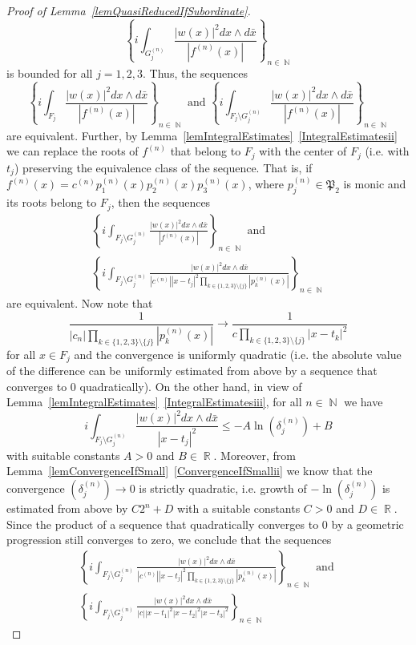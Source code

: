 \documentclass{amsart}
\numberwithin{equation}{section}
\theoremstyle{definition}
\theoremstyle{remark}
\DeclareMathOperator{\RR}{\mathbb R}
\DeclareMathOperator{\NN}{\mathbb N}
\begin{document}
\begin{proof}[Proof of Lemma~\ref{lemQuasiReducedIfSubordinate}]
		\[
		\left\{i\int_{G_j^{(n)}}\frac{|w(x)|^2dx \wedge d\bar{x}}{|f^{(n)}(x)|}\right\}_{n \in \NN}
		\]
		is bounded for all $j = 1,2,3$. Thus, the sequences
		\[
		\left\{i\int_{F_j}\frac{|w(x)|^2dx \wedge d\bar{x}}{|f^{(n)}(x)|}\right\}_{n \in \NN} \text{ and } \left\{i\int_{F_j \setminus G_j^{(n)}}\frac{|w(x)|^2dx \wedge d\bar{x}}{|f^{(n)}(x)|}\right\}_{n \in \NN}
		\]
		are equivalent. Further, by Lemma~\ref{lemIntegralEstimates}~\ref{IntegralEstimatesii} we can replace the roots of $f^{(n)}$ that belong to $F_j$ with the center of $F_j$ (i.e. with $t_j$) preserving the equivalence class of the sequence. That is, if $f^{(n)}(x) = c^{(n)}p_1^{(n)}(x)p_2^{(n)}(x)p_3^{(n)}(x)$, where $p_j^{(n)} \in \mathfrak P_2$ is monic and its roots belong to $F_j$, then the sequences
		\begin{multline*}
			\left\{i\int_{F_j \setminus G_j^{(n)}}\frac{|w(x)|^2dx \wedge d\bar{x}}{|f^{(n)}(x)|}\right\}_{n \in \NN} \text{ and }\\ \left\{i\int_{F_j \setminus G_j^{(n)}}\frac{|w(x)|^2dx \wedge d\bar{x}}{|c^{(n)}||x - t_j|^2\displaystyle\prod_{k \in \{1,2,3\}\setminus \{j\}}|p_k^{(n)}(x)|}\right\}_{n \in \NN}
		\end{multline*}
		are equivalent. Now note that
		\[
		\frac{1}{|c_n|\displaystyle\prod_{k \in \{1,2,3\}\setminus \{j\}}|p_k^{(n)}(x)|} \to \frac{1}{c\displaystyle\prod_{k \in \{1,2,3\}\setminus \{j\}}|x - t_k|^2}
		\]
		for all $x \in F_j$ and the convergence is uniformly quadratic (i.e. the absolute value of the difference can be uniformly estimated from above by a sequence that converges to $0$ quadratically). On the other hand, in view of Lemma~\ref{lemIntegralEstimates}~\ref{IntegralEstimatesiii}, for all $n \in \NN$ we have
		\[
		i\int_{F_j \setminus G_j^{(n)}}\frac{|w(x)|^2dx \wedge d\bar{x}}{|x - t_j|^2} \le -A\ln\left(\delta_j^{(n)}\right) + B
		\]
		with suitable constants $A > 0$ and $B \in \RR$. Moreover, from Lemma~\ref{lemConvergenceIfSmall}~\ref{ConvergenceIfSmallii} we know that the convergence $\left(\delta_j^{(n)}\right) \to 0$ is strictly quadratic, i.e. growth of $-\ln\left(\delta_j^{(n)}\right)$ is estimated from above by $C2^n + D$ with a suitable constants $C > 0$ and $D \in \RR$. Since the product of a sequence that quadratically converges to $0$ by a geometric progression still converges to zero, we conclude that the sequences
		\begin{multline}\label{eqFinalSequence}
			\left\{i\int_{F_j \setminus G_j^{(n)}}\frac{|w(x)|^2dx \wedge d\bar{x}}{|c^{(n)}||x - t_j|^2\displaystyle\prod_{k \in \{1,2,3\}\setminus \{j\}}|p_k^{(n)}(x)|}\right\}_{n \in \NN} \text{ and }\\ \left\{i\int_{F_j \setminus G_j^{(n)}}\frac{|w(x)|^2dx \wedge d\bar{x}}{|c||x - t_1|^2|x - t_2|^2|x - t_3|^2}\right\}_{n \in \NN}

\end{multline}
\end{proof}
\end{document}
